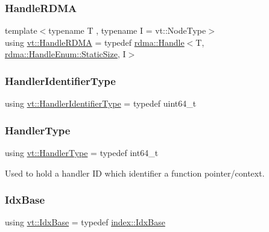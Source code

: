 \mbox{\label{namespacevt_abc3449a4b87363b942453d0b8cc18a7d}} 
\subsubsection{\texorpdfstring{Handle\+R\+D\+MA}{HandleRDMA}}
{\footnotesize\ttfamily template$<$typename T , typename I  = vt\+::\+Node\+Type$>$ \\
using \hyperlink{namespacevt_abc3449a4b87363b942453d0b8cc18a7d}{vt\+::\+Handle\+R\+D\+MA} = typedef \hyperlink{structvt_1_1rdma_1_1_handle}{rdma\+::\+Handle}$<$T, \hyperlink{namespacevt_1_1rdma_a0234ff19cfb3c04718cfdfd36b2d6d88a0c5c41d6a0319a61d3a5e8a060b7c4d7}{rdma\+::\+Handle\+Enum\+::\+Static\+Size}, I$>$}

\mbox{\label{namespacevt_a59ae068fe828d1c33051ff96f3d016b6}} 
\subsubsection{\texorpdfstring{Handler\+Identifier\+Type}{HandlerIdentifierType}}
{\footnotesize\ttfamily using \hyperlink{namespacevt_a59ae068fe828d1c33051ff96f3d016b6}{vt\+::\+Handler\+Identifier\+Type} = typedef uint64\+\_\+t}

\mbox{\label{namespacevt_af64846b57dfcaf104da3ef6967917573}} 
\subsubsection{\texorpdfstring{Handler\+Type}{HandlerType}}
{\footnotesize\ttfamily using \hyperlink{namespacevt_af64846b57dfcaf104da3ef6967917573}{vt\+::\+Handler\+Type} = typedef int64\+\_\+t}



Used to hold a handler ID which identifier a function pointer/context. 

\mbox{\label{namespacevt_afb96657e28fa98eb685c5e0c6b1b122e}} 
\subsubsection{\texorpdfstring{Idx\+Base}{IdxBase}}
{\footnotesize\ttfamily using \hyperlink{namespacevt_afb96657e28fa98eb685c5e0c6b1b122e}{vt\+::\+Idx\+Base} = typedef \hyperlink{namespacevt_1_1index_a0dbb8d47463da27c1436e8e4ddb02743}{index\+::\+Idx\+Base}}

